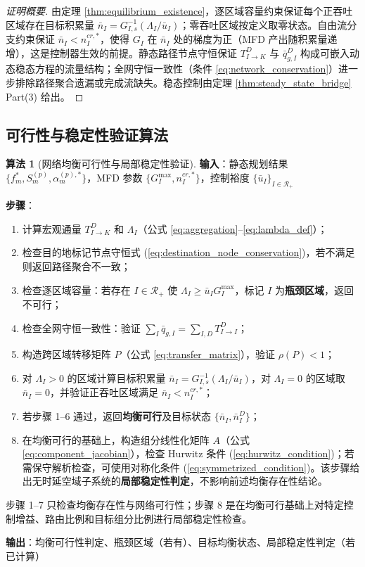 \documentclass[a4paper,12pt]{article}
\theoremstyle{plain}
\theoremstyle{definition}
\newtheorem{algorithm}[theorem]{算法}
\theoremstyle{remark}
\begin{document}
\begin{proof}[证明概要]
由定理 \ref{thm:equilibrium_existence}，逐区域容量约束保证每个正吞吐区域存在目标积累量 $\bar{n}_I = G_{I,s}^{-1}(\Lambda_I/\bar u_I)$；零吞吐区域按定义取零状态。自由流分支约束保证 $\bar{n}_I < n_I^{cr,*}$，使得 $G_I$ 在 $\bar{n}_I$ 处的梯度为正（MFD 产出随积累量递增），这是控制器生效的前提。静态路径节点守恒保证 $T_{I\to K}^D$ 与 $\bar q_{g,I}^D$ 构成可嵌入动态稳态方程的流量结构；全网守恒一致性（条件 \ref{eq:network_conservation}）进一步排除路径聚合遗漏或完成流缺失。稳态控制由定理 \ref{thm:steady_state_bridge} Part(3) 给出。
\end{proof}

\subsection{可行性与稳定性验证算法}

\begin{algorithm}[网络均衡可行性与局部稳定性验证]
\textbf{输入}：静态规划结果 $\{f_m^*, S_m^{(p)}, \alpha_m^{(p),*}\}$，MFD 参数 $\{G_I^{\max}, n_I^{cr,*}\}$，控制裕度 $\{\bar u_I\}_{I\in\mathcal R_+}$

\textbf{步骤}：
\begin{enumerate}
    \item 计算宏观通量 $T_{I \to K}^D$ 和 $\Lambda_I$（公式 \ref{eq:aggregation}--\ref{eq:lambda_def}）；
    \item 检查目的地标记节点守恒式 (\ref{eq:destination_node_conservation})，若不满足则返回路径聚合不一致；
    \item 检查逐区域容量：若存在 $I\in\mathcal R_+$ 使 $\Lambda_I \ge \bar u_I G_I^{\max}$，标记 $I$ 为\textbf{瓶颈区域}，返回不可行；
    \item 检查全网守恒一致性：验证 $\sum_I \bar{q}_{g,I} = \sum_{I,D} T_{I \to I}^D$；
    \item 构造跨区域转移矩阵 $P$（公式 \ref{eq:transfer_matrix}），验证 $\rho(P)<1$；
    \item 对 $\Lambda_I>0$ 的区域计算目标积累量 $\bar{n}_I = G_{I,s}^{-1}(\Lambda_I/\bar u_I)$，对 $\Lambda_I=0$ 的区域取 $\bar n_I=0$，并验证正吞吐区域满足 $\bar{n}_I < n_I^{cr,*}$；
    \item 若步骤 1--6 通过，返回\textbf{均衡可行}及目标状态 $\{\bar{n}_I, \bar{n}_I^D\}$；
    \item 在均衡可行的基础上，构造组分线性化矩阵 $A$（公式 \ref{eq:component_jacobian}），检查 Hurwitz 条件 (\ref{eq:hurwitz_condition})；若需保守解析检查，可使用对称化条件 (\ref{eq:symmetrized_condition})。该步骤给出无时延空域子系统的\textbf{局部稳定性判定}，不影响前述均衡存在性结论。
\end{enumerate}

步骤 1--7 只检查均衡存在性与网络可行性；步骤 8 是在均衡可行基础上对特定控制增益、路由比例和目标组分比例进行局部稳定性检查。

\textbf{输出}：均衡可行性判定、瓶颈区域（若有）、目标均衡状态、局部稳定性判定（若已计算）
\end{algorithm}
\end{document}

